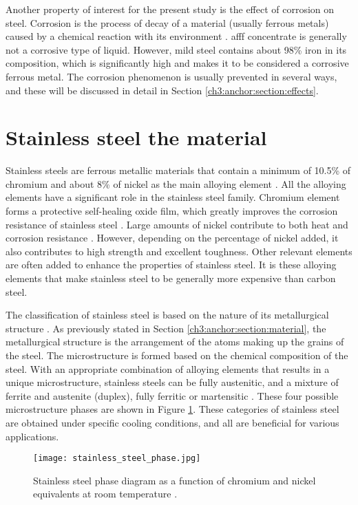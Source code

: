 Another property of interest for the present study is the effect of corrosion on steel. Corrosion is the process of decay of a material (usually ferrous metals) caused by a chemical reaction with its environment \cite{islam2018effects}. \acrshort{afff} concentrate is generally not a corrosive type of liquid. However, mild steel contains about 98\% iron in its composition, which is significantly high and makes it to be considered a corrosive ferrous metal.  The corrosion phenomenon is usually prevented in several ways, and these will be discussed in detail in Section \ref{ch3:anchor:section:effects}.


\section{Stainless steel the material} 
Stainless steels are ferrous metallic materials that contain a minimum of 10.5\% of chromium and about 8\% of nickel as the main alloying element \cite{sourmail2005stainless}. All the alloying elements have a significant role in the stainless steel family. Chromium element forms a protective self-healing oxide film, which greatly improves the corrosion resistance of stainless steel \cite{molabe2018determining}. Large amounts of nickel contribute to both heat and corrosion resistance \cite{george2002introduction}. However, depending on the percentage of nickel added, it also contributes to high strength and excellent toughness. Other relevant elements are often added to enhance the properties of stainless steel. It is these alloying elements that make stainless steel to be generally more expensive than carbon steel.

The classification of stainless steel is based on the nature of its metallurgical structure \cite{bhadeshia2017steels}. As previously stated in Section \ref{ch3:anchor:section:material}, the metallurgical structure is the arrangement of the atoms making up the grains of the steel. The microstructure is formed based on the chemical composition of the steel. With an appropriate combination of alloying elements that results in a unique microstructure, stainless steels can be fully austenitic, and a mixture of ferrite and austenite (duplex), fully ferritic or martensitic \cite{bhadeshia2017steels}. These four possible microstructure phases are shown in Figure \ref{ch3:figure:steel_phase}. These categories of stainless steel are obtained under specific cooling conditions, and all are beneficial for various applications.
 
\begin{figure}[H]
    \centering
    \texttt{[image: stainless\_steel\_phase.jpg]}
    \caption{Stainless steel phase diagram as a function of chromium and nickel equivalents at room temperature \cite{bhadeshia2017steels}.}
    \label{ch3:figure:steel_phase}
\end{figure}

